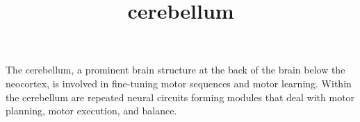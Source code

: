 \documentclass[a4paper]{article}
\title{cerebellum}
\date{}
\begin{document}
    \maketitle
    The cerebellum, a prominent brain structure at the back of the brain below
    the neocortex, is involved in fine-tuning motor sequences and motor learning.
    Within the cerebellum are repeated neural circuits forming modules that deal
    with motor planning, motor execution, and balance.
\end{document}
